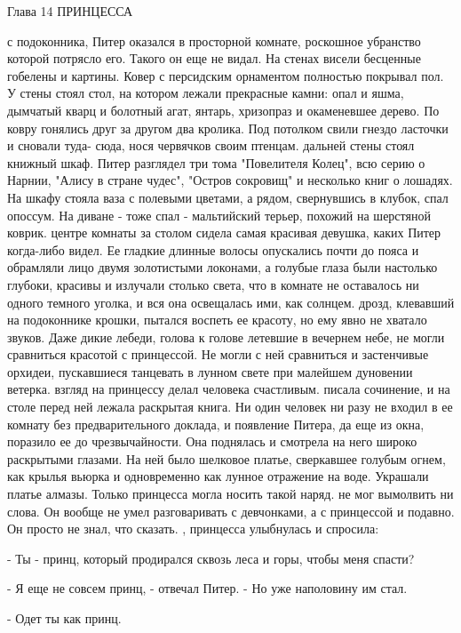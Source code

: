 Глава 14
 ПРИНЦЕССА
\par{} с подоконника, Питер оказался в просторной комнате, 
роскошное убранство которой потрясло его. Такого он еще не видал. На 
стенах висели бесценные гобелены и картины. Ковер с персидским 
орнаментом полностью покрывал пол. У стены стоял стол, на котором 
лежали прекрасные камни: опал и яшма, дымчатый кварц и болотный агат, 
янтарь, хризопраз и окаменевшее дерево. По ковру гонялись друг за 
другом два кролика. Под потолком свили гнездо ласточки и сновали туда-
сюда, нося червячков своим птенцам.
 дальней стены стоял книжный шкаф. Питер разглядел три тома 
"Повелителя Колец", всю серию о Нарнии, "Алису в стране чудес", 
"Остров сокровищ" и несколько книг о лошадях. На шкафу стояла ваза с 
полевыми цветами, а рядом, свернувшись в клубок, спал опоссум. На 
диване - тоже спал - мальтийский терьер, похожий на шерстяной коврик.
 центре комнаты за столом сидела самая красивая девушка, каких 
Питер когда-либо видел. Ее гладкие длинные волосы опускались почти до 
пояса и обрамляли лицо двумя золотистыми локонами, а голубые глаза 
были настолько глубоки, красивы и излучали столько света, что в 
комнате не оставалось ни одного темного уголка, и вся она освещалась 
ими, как солнцем.
 дрозд, клевавший на подоконнике крошки, пытался воспеть ее 
красоту, но ему явно не хватало звуков. Даже дикие лебеди, голова к 
голове летевшие в вечернем небе, не могли сравниться красотой с 
принцессой. Не могли с ней сравниться и застенчивые орхидеи, 
пускавшиеся танцевать в лунном свете при малейшем дуновении ветерка.
 взгляд на принцессу делал человека счастливым.
 писала сочинение, и на столе перед ней лежала раскрытая 
книга. Ни один человек ни разу не входил в ее комнату без 
предварительного доклада, и появление Питера, да еще из окна, поразило 
ее до чрезвычайности. Она поднялась и смотрела на него широко 
раскрытыми глазами. На ней было шелковое платье, сверкавшее голубым 
огнем, как крылья вьюрка и одновременно как лунное отражение на воде. 
Украшали платье алмазы. Только принцесса могла носить такой наряд.
 не мог вымолвить ни слова. Он вообще не умел разговаривать с 
девчонками, а с принцессой и подавно. Он просто не знал, что сказать.
, принцесса улыбнулась и спросила:
\par- Ты - принц, который продирался сквозь леса и горы, чтобы меня 
спасти?
\par- Я еще не совсем принц, - отвечал Питер. - Но уже наполовину им 
стал.
\par- Одет ты как принц.
